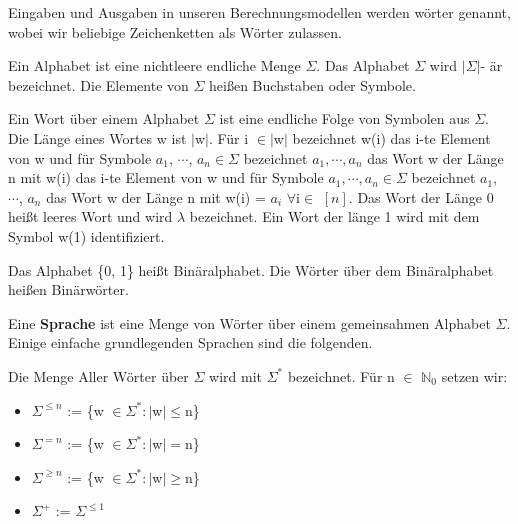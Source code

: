 Eingaben und Ausgaben in unseren Berechnungsmodellen werden wörter genannt, wobei wir beliebige Zeichenketten als Wörter zulassen.

Ein Alphabet ist eine nichtleere endliche Menge $\Sigma$. Das Alphabet $\Sigma$ wird $\lvert \Sigma \rvert$- är bezeichnet. Die Elemente von $\Sigma$ heißen Buchstaben oder Symbole.

Ein Wort über einem Alphabet $\Sigma$ ist eine endliche Folge von Symbolen aus $\Sigma$. Die Länge eines Wortes w ist $\lvert$w$\rvert$. Für i $\in\lvert$w$\rvert$ bezeichnet w(i) das i-te Element von w und für Symbole $a_{1}$, $\cdots$, $a_{n} \in \Sigma$ bezeichnet $a_{1}, \cdots, a_{n}$ das Wort w der Länge n mit w(i) das i-te Element von w und für Symbole $a_{1}, \cdots, a_{n} \in \Sigma$ bezeichnet $a_{1}$, $\cdots$, $a_{n}$ das Wort w der Länge n mit w(i) = $a_{i}$ $\forall$i$\in$ \([n]\). Das Wort der Länge 0 heißt leeres Wort und wird $\lambda$ bezeichnet. Ein Wort der länge 1 wird mit dem Symbol w(1) identifiziert.

Das Alphabet \{0, 1\} heißt Binäralphabet. Die Wörter über dem Binäralphabet heißen Binärwörter.

Eine \textbf{Sprache} ist eine Menge von Wörter über einem gemeinsahmen Alphabet $\Sigma$. Einige einfache grundlegenden Sprachen sind die folgenden.

Die Menge Aller Wörter über $\Sigma$ wird mit $\Sigma^{*}$ bezeichnet. Für n $\in$ $\mathbb{N}_{0}$ setzen wir:
\begin{itemize}
    \item[] $\Sigma^{\leq n}$ := \{w $\in \Sigma^{*} : \lvert$w$\rvert \leq $n\}
    \item[] $\Sigma^{=n}$ := \{w $\in \Sigma^{*} : \lvert$w$\rvert = $n\}
    \item[] $\Sigma^{\geq n}$ := \{w $\in \Sigma^{*} : \lvert$w$\rvert \geq $n\}
    \item[] $\Sigma^{+}$ := $\Sigma^{\leq 1}$
\end{itemize}

